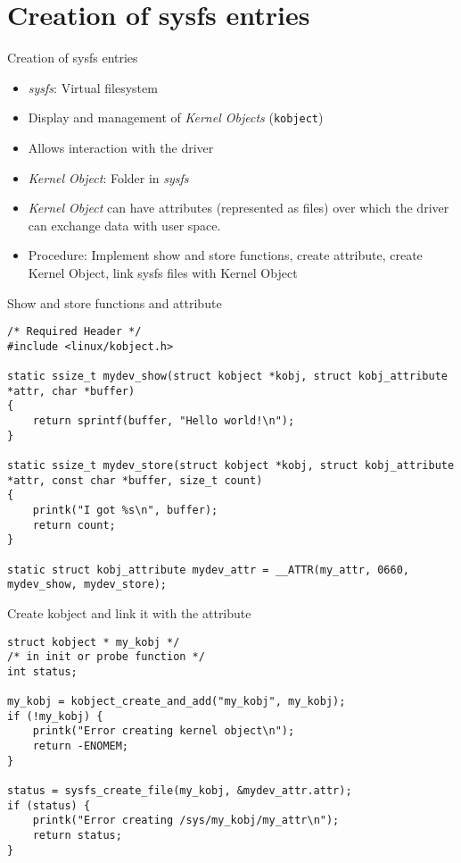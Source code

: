 \documentclass[aspectratio=169]{beamer}
\begin{document}
\section{Creation of sysfs entries} 
\begin{frame}{Creation of sysfs entries}
	\begin{itemize}
		\item \textit{sysfs}: Virtual filesystem
		\item Display and management of \textit{Kernel Objects} (\lstinline|kobject|)
		\item Allows interaction with the driver
		\item \textit{Kernel Object}: Folder in \textit{sysfs}
		\item \textit{Kernel Object} can have attributes (represented as files) over which the driver can exchange data with user space.
		\item Procedure: Implement show and store functions, create attribute, create Kernel Object, link sysfs files with Kernel Object
	\end{itemize}
\end{frame}


\begin{frame}[fragile]{Show and store functions and attribute}
	\begin{lstlisting}
/* Required Header */
#include <linux/kobject.h>

static ssize_t mydev_show(struct kobject *kobj, struct kobj_attribute *attr, char *buffer)
{
	return sprintf(buffer, "Hello world!\n");
}

static ssize_t mydev_store(struct kobject *kobj, struct kobj_attribute *attr, const char *buffer, size_t count)
{
	printk("I got %s\n", buffer);
	return count;
}

static struct kobj_attribute mydev_attr = __ATTR(my_attr, 0660, mydev_show, mydev_store);
	\end{lstlisting}
\end{frame}

\begin{frame}[fragile]{Create kobject and link it with the attribute}
	\begin{lstlisting}
struct kobject * my_kobj */
/* in init or probe function */
int status;

my_kobj = kobject_create_and_add("my_kobj", my_kobj);
if (!my_kobj) {
	printk("Error creating kernel object\n");
	return -ENOMEM;
}

status = sysfs_create_file(my_kobj, &mydev_attr.attr);
if (status) {
	printk("Error creating /sys/my_kobj/my_attr\n");
	return status;
}
	\end{lstlisting}
\end{frame}
\end{document}
